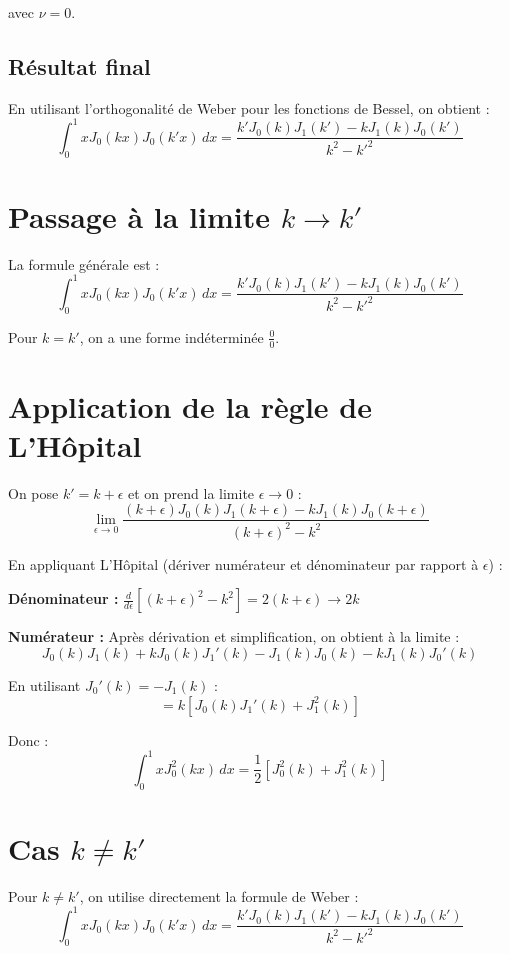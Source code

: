 \documentclass[a4paper,11pt]{article}
\begin{document}
avec $\nu = 0$.

\subsection*{Résultat final}

En utilisant l'orthogonalité de Weber pour les fonctions de Bessel, on obtient :
\[
\boxed{\int_0^1 x J_0(kx) J_0(k'x) \, dx = \frac{k' J_0(k) J_1(k') - k J_1(k) J_0(k')}{k^2 - k'^2}}
\]

\section*{Passage à la limite $k \to k'$}

La formule générale est :
\[
\int_0^1 x J_0(kx) J_0(k'x) \, dx = \frac{k' J_0(k) J_1(k') - k J_1(k) J_0(k')}{k^2 - k'^2}
\]

Pour $k = k'$, on a une forme indéterminée $\frac{0}{0}$.

\section*{Application de la règle de L'Hôpital}

On pose $k' = k + \epsilon$ et on prend la limite $\epsilon \to 0$ :
\[
\lim_{\epsilon \to 0} \frac{(k+\epsilon) J_0(k) J_1(k+\epsilon) - k J_1(k) J_0(k+\epsilon)}{(k+\epsilon)^2 - k^2}
\]

En appliquant L'Hôpital (dériver numérateur et dénominateur par rapport à $\epsilon$) :

\textbf{Dénominateur :} $\frac{d}{d\epsilon}[(k+\epsilon)^2 - k^2] = 2(k+\epsilon) \to 2k$

\textbf{Numérateur :} Après dérivation et simplification, on obtient à la limite :
\[
J_0(k) J_1(k) + k J_0(k) J_1'(k) - J_1(k) J_0(k) - k J_1(k) J_0'(k)
\]

En utilisant $J_0'(k) = -J_1(k)$ :
\[
= k[J_0(k) J_1'(k) + J_1^2(k)]
\]

Donc :
\[
\boxed{\int_0^1 x J_0^2(kx) \, dx = \frac{1}{2}\left[J_0^2(k) + J_1^2(k)\right]}
\]

\section*{Cas $k \neq k'$}

Pour $k \neq k'$, on utilise directement la formule de Weber :
\[
\boxed{\int_0^1 x J_0(kx) J_0(k'x) \, dx = \frac{k' J_0(k) J_1(k') - k J_1(k) J_0(k')}{k^2 - k'^2}}
\]
\end{document}
